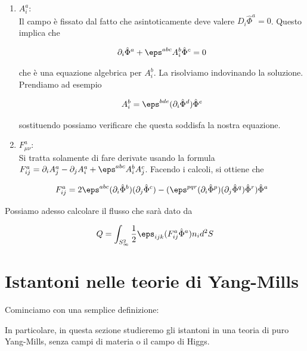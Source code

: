 \documentclass{report}
\begin{document}
\begin{enumerate}
    \item \(A^a_i\): \\
    Il campo è fissato dal fatto che asintoticamente deve valere \(D_i \hat{\Phi}^a = 0\). Questo implica che 

    \begin{align}
        \partial_i \hat{\Phi}^a + \eps^{abc}A^b_i \hat{\Phi}^c = 0 
    \end{align}

    che è una equazione algebrica per \(A^b_i\). La risolviamo indovinando la soluzione. Prendiamo ad esempio

    \begin{align}
        A^b_i = \eps^{bde}(\partial_i \hat{\Phi}^d)\hat{\Phi}^e
    \end{align}

    sostituendo possiamo verificare che questa soddisfa la nostra equazione. 
    \item \(F^a_{\mu\nu}\): \\
    Si tratta solamente di fare derivate usando la formula \(F^a_{ij} = \partial_i A^a_j - \partial_j A^a_i + \eps^{abc}A^b_i A^c_j\). Facendo i calcoli, si ottiene che 

    \begin{align}
        F^a_{ij} = 2\eps^{abc}(\partial_i \hat{\Phi}^b)(\partial_j \hat{\Phi}^c) - (\eps^{pqr}(\partial_i \hat{\Phi}^p)(\partial_j \hat{\Phi}^q)\hat{\Phi}^r)\hat{\Phi}^a
    \end{align}
\end{enumerate}

Possiamo adesso calcolare il flusso che sarà dato da 

\begin{align}
    Q = \int_{S^2_\infty}\frac{1}{2}\eps_{ijk}(F^a_{ij}\hat{\Phi}^a)n_i d^2S 
\end{align}



\section{Istantoni nelle teorie di Yang-Mills}

Cominciamo con una semplice definizione: 


In particolare, in questa sezione studieremo gli istantoni in una teoria di puro Yang-Mills, senza campi di materia o il campo di Higgs. \\
\end{document}
